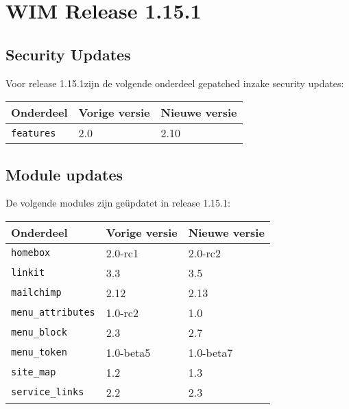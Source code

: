 

\newcommand{\release}{1.15.1}
\newcommand{\projectname}{WIM Release \release}

\newcommand{\customer}{Dimpact} %
\newcommand{\customershort}{Dimpact} %

\newcommand{\customerdomain}{dimpact.nl}
\newcommand{\authors}{R. Meijer}
\newcommand{\lastversion}{1.0}
\newcommand{\lastupdate}{22-04-2016}






\tableofcontents
\pagebreak



\section{\projectname} %
\label{sec:release}



\subsection{Security Updates} %
\label{sub:security_updates}

Voor release \release zijn de volgende onderdeel gepatched inzake security updates:

\begin{tabularx}{\linewidth}{X|l|l} \hline
  Onderdeel & Vorige versie & Nieuwe versie \\ \hline
  \texttt{features} & 2.0 & 2.10 \\ \hline
\end{tabularx}




\subsection{Module updates} %
\label{sub:module_updates}

De volgende modules zijn ge\"updatet in release \release:

\begin{tabularx}{\linewidth}{X|l|l} \hline
  Onderdeel & Vorige versie & Nieuwe versie \\ \hline
  \texttt{homebox} & 2.0-rc1 & 2.0-rc2 \\ \hline
  \texttt{linkit} & 3.3 & 3.5 \\ \hline
  \texttt{mailchimp} & 2.12 & 2.13 \\ \hline
  \texttt{menu\_attributes} & 1.0-rc2 & 1.0 \\ \hline
  \texttt{menu\_block} & 2.3 & 2.7 \\ \hline
  \texttt{menu\_token} & 1.0-beta5 & 1.0-beta7 \\ \hline
  \texttt{site\_map} & 1.2 & 1.3 \\ \hline
  \texttt{service\_links} & 2.2 & 2.3 \\ \hline
\end{tabularx}


